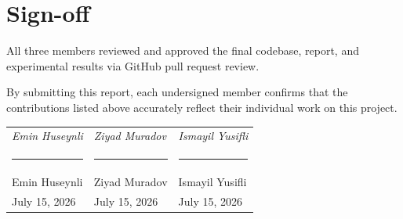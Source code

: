 \documentclass[11pt,a4paper]{article}
\begin{document}
\section*{Sign-off}

All three members reviewed and approved the final codebase, report, and
experimental results via GitHub pull request review.

\medskip
\noindent
By submitting this report, each undersigned member confirms that the
contributions listed above accurately reflect their individual work on
this project.

\bigskip
\begin{tabular}{p{5cm} p{5cm} p{5cm}}
\textit{Emin Huseynli} & \textit{Ziyad Muradov} & \textit{Ismayil Yusifli} \\
\rule{4.5cm}{0.4pt} & \rule{4.5cm}{0.4pt} & \rule{4.5cm}{0.4pt} \\
Emin Huseynli & Ziyad Muradov & Ismayil Yusifli \\
July 15, 2026 & July 15, 2026 & July 15, 2026 \\
\end{tabular}
\end{document}
